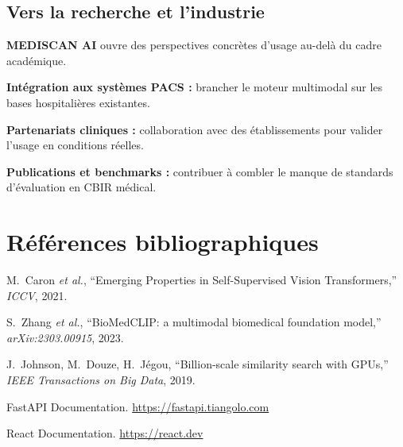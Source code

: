 \documentclass[12pt,a4paper]{article}
\newcommand{\NewMajorPart}{\clearpage}
\begin{document}
\subsection{Vers la recherche et l'industrie}

\vspace{0.15cm}
\textbf{MEDISCAN AI} ouvre des perspectives concrètes d'usage au-delà du cadre académique.

\vspace{0.15cm}
\begin{sq}
  \item \textbf{Intégration aux systèmes PACS :} brancher le moteur multimodal sur les bases hospitalières existantes.
  \item \textbf{Partenariats cliniques :} collaboration avec des établissements pour valider l'usage en conditions réelles.
  \item \textbf{Publications et benchmarks :} contribuer à combler le manque de standards d'évaluation en CBIR médical.
\end{sq}

\NewMajorPart
\section*{Références bibliographiques}

\begin{num}
  \item M.~Caron \textit{et al.}, ``Emerging Properties in Self-Supervised Vision
        Transformers,'' \textit{ICCV}, 2021.
  \item S.~Zhang \textit{et al.}, ``BioMedCLIP: a multimodal biomedical foundation
        model,'' \textit{arXiv:2303.00915}, 2023.
  \item J.~Johnson, M.~Douze, H.~Jégou, ``Billion-scale similarity search with GPUs,''
        \textit{IEEE Transactions on Big Data}, 2019.
  \item FastAPI Documentation. \url{https://fastapi.tiangolo.com}
  \item React Documentation. \url{https://react.dev}
\end{num}

\NewMajorPart
\appendix
\end{document}
